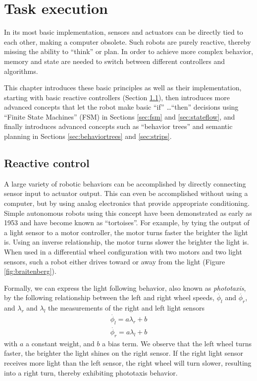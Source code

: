 \chapter{Task execution}
In its most basic implementation, sensors and actuators can be directly tied to each other, making a computer obsolete. Such robots are purely reactive, thereby missing the ability to ``think'' or plan. In order to achieve more complex behavior, memory and state are needed to switch between different controllers and algorithms.

This chapter introduces these basic principles as well as their implementation, starting with basic reactive controllers (Section \ref{sec:braitenberg}), then introduces more advanced concepts that let the robot make basic ``if'' \ldots ``then'' decisions using ``Finite State Machines'' (FSM) in Sections \ref{sec:fsm} and \ref{sec:stateflow}, and finally introduces advanced concepts such as ``behavior trees'' and semantic planning in Sections \ref{sec:behaviortrees} and \ref{sec:strips}.

\section{Reactive control}\label{sec:braitenberg}
A large variety of robotic behaviors can be accomplished by directly connecting sensor input to actuator output. This can even be accomplished without using a computer, but by using analog electronics that provide appropriate conditioning. Simple autonomous robots using this concept have been demonstrated as early as 1953 \cite{walter1953living} and have become known as ``tortoises''. For example, by tying the output of a light sensor to a motor controller, the motor turns faster the brighter the light is. Using an inverse relationship, the motor turns slower the brighter the light is. When used in a differential wheel configuration with two motors and two light sensors, such a robot either drives toward or away from the light (Figure \ref{fig:braitenberg}). 

Formally, we can express the light following behavior, also known as \emph{phototaxis}, by the following relationship between 
the left and right wheel speeds, $\dot{\phi_l}$ and $\dot{\phi_r}$, and  $\lambda_r$ and $\lambda_l$ the measurements of the right and left light sensors
\begin{eqnarray}\label{eq:simplereactive}
\dot{\phi_l}=a \lambda_r + b\\
\dot{\phi_r}=a \lambda_l + b
\end{eqnarray}
with $a$ a constant weight, and $b$ a bias term. We observe that the left wheel turns faster, the brighter the light shines on the right sensor. If the right light sensor receives more light than the left sensor, the right wheel will turn slower, resulting into a right turn, thereby exhibiting phototaxis behavior.


